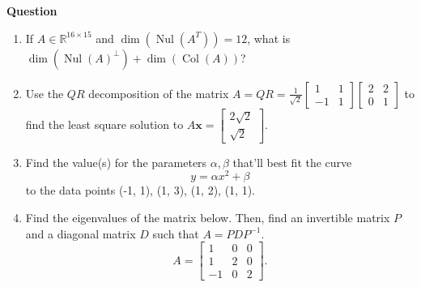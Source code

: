 \documentclass[10pt, titlepage]{article}
\newcounter{question}
\newenvironment{newquestion}
{
	\noindent\textbf{Question \thequestion}
}
{
\stepcounter{question}
\par
}
\renewcommand{\vec}[1]{\bm{#1}}
\DeclareMathOperator{\colspace}{Col}
\DeclareMathOperator{\nullspace}{Nul}
\begin{document}
\begin{newquestion}
\begin{enumerate}
		\item If \(A \in \mathbb{R}^{16 \times 15}\) and \(\dim(\nullspace(A^T)) = 12\), what is \(\dim(\nullspace(A)^\perp) + \dim(\colspace(A))\)?
		\item Use the \(QR\) decomposition of the matrix \(A = QR = \displaystyle \frac{1}{\sqrt{2}}\begin{bmatrix}1 & 1 \\ -1 & 1\end{bmatrix}\begin{bmatrix}2 & 2 \\ 0 & 1\end{bmatrix}\) to find the least square solution to \(A\vec{x} = \begin{bmatrix}2\sqrt{2} \\ \sqrt{2}\end{bmatrix}\).
		\item Find the value(s) for the parameters \(\alpha, \beta\) that'll best fit the curve \[y = \alpha x^2 + \beta\] to the data points (-1, 1), (1, 3), (1, 2),
			(1, 1).
		\item Find the eigenvalues of the matrix below. Then, find an invertible matrix \(P\) and a diagonal matrix \(D\) such that \(A = PDP^{-1}\). 
			\[A = \begin{bmatrix}1 & 0 & 0 \\ 1 & 2 & 0 \\ -1 & 0 & 2\end{bmatrix}.\]
	\end{enumerate}
\end{newquestion}


\end{document}
